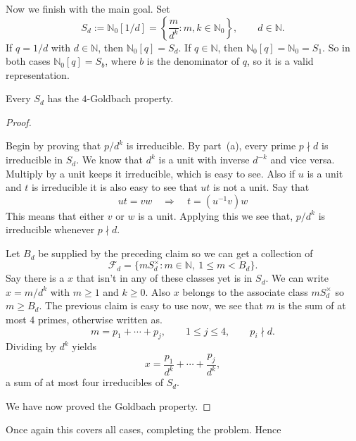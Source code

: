 \documentclass[11pt]{scrartcl}
\begin{document}
\begin{soln}
    \subsubsection*{}

	Now we finish with the main goal. 
	Set    \[
    S_d:=\mathbb N_0[1/d]
    =\left\{\frac{m}{d^k}:m,k\in\mathbb N_0\right\},
    \qquad d\in\mathbb N.
    \]
If $q=1/d$ with $d\in\mathbb N$, then $\mathbb N_0[q]=S_d$. If
$q\in\mathbb N$, then $\mathbb N_0[q]=\mathbb N_0=S_1$. So in both
cases $\mathbb N_0[q]=S_b$, where $b$ is the denominator of $q$, so it is a 
valid representation. 
    \begin{claim*}
        Every $S_d$ has the $4$-Goldbach property.
    \end{claim*}

    \begin{proof}
        \begin{subproof}
			Begin by proving that $p/d^k$ is irreducible. 
            By part~(a), every prime $p\nmid d$ is irreducible
            in $S_d$.
			We know that $d^k$ is a unit with inverse $d^{-k}$ and vice versa.
			Multiply by a unit keeps it irreducible, which is easy to see. Also 
			if $u$ is a unit and $t$ is irreducible it is also easy to see that 
			$ut$ is not a unit. 
			Say that 
            \[
            ut=vw
            \quad\Longrightarrow\quad
            t=(u^{-1}v)w
            \]
            This means that either $v$ or $w$ is a unit. Applying this 
			we see that, $p/d^k$ is irreducible whenever
            $p\nmid d$.
        \end{subproof}

        \begin{subproof}
            Let $B_d$ be supplied by the preceding claim so we can get a collection 
			of 
            \[
            \mathcal F_d
            =\{mS_d^\times:m\in\mathbb N,\ 1\le m<B_d\}.
            \]
			Say there is a $x$ that isn't in any of these classes yet is in 
			$S_d$. We can write $x=m/d^k$ with
            $m\ge1$ and $k\ge0$. Also $x$ belongs to the
            associate class $mS_d^\times$ so  $m\ge B_d$.
            The previous claim is easy to use now, we see that $m$ is
			the sum of at most $4$ primes, otherwise written as. 
            \[
            m=p_1+\cdots+p_j,
            \qquad
            1\le j\le4,
            \qquad
            p_i\nmid d.
            \]
            Dividing by $d^k$ yields
            \[
            x=\frac{p_1}{d^k}+\cdots+\frac{p_j}{d^k},
            \]
            a sum of at most four irreducibles of $S_d$.
        \end{subproof}

        We have now proved the Goldbach property. 
    \end{proof}

    Once again this covers all cases, completing the problem. 
    Hence
\end{soln}
\end{document}
